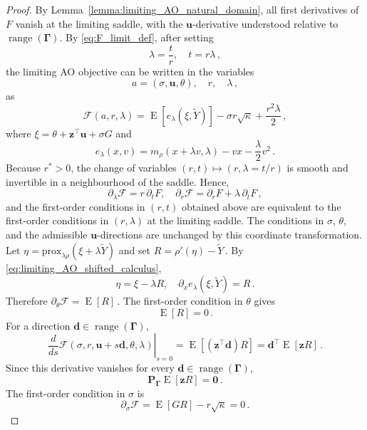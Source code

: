 \documentclass{article}
\DeclareMathOperator{\expect}{E}
\theoremstyle{definition}
\newcommand*{\bb}{\boldsymbol}
\newcommand{\prox}[2]{\ensuremath{\textrm{prox}_{#1}\left(#2\right)}}
\def\bu{\bb{u}}
\def\Ytil{\widetilde{Y}}
\def\bz{\bb{z}}
\newcommand{\range}{\operatorname{range}}
\begin{document}
\begin{bibunit}
\begin{proof}
	By Lemma~\ref{lemma:limiting_AO_natural_domain}, all first derivatives
	of $F$ vanish at the limiting saddle, with the $\bu$-derivative
	understood relative to $\range(\bb\Gamma)$.
	By \eqref{eq:F_limit_def}, after setting
	$$
		\lambda=\frac tr,
		\quad
		t=r\lambda\,,
	$$
	the limiting AO objective can be written in the variables
	$$
		a=(\sigma,\bu,\theta),
		\quad
		r,
		\quad
		\lambda\,,
	$$
	as
	\begin{equation}
		\label{eq:limiting_AO_transformed_objective}
		\mathcal F(a,r,\lambda)
		=
		\expect[
			e_\lambda(\xi,\Ytil)
		]
		-
		\sigma r\sqrt\kappa
		+
		\frac{r^2\lambda}{2}\,,
	\end{equation}
	where $\xi=\theta+\bz^\top\bu+\sigma G$
	and
	$$
		e_\lambda(x,v)
		=
		m_\rho(x+\lambda v,\lambda)-vx-\frac{\lambda}{2}v^2\,.
	$$
	Because $r^*>0$, the change of variables $(r,t)\mapsto(r,\lambda=t/r)$ is smooth and invertible in a neighbourhood of the saddle. 
    Hence, 
	$$
		\partial_\lambda\mathcal F
		=
		r\,\partial_tF,
		\quad
		\partial_r\mathcal F
		=
		\partial_rF+\lambda\,\partial_tF\,,
	$$
	and the first-order conditions in $(r,t)$ obtained above are equivalent
	to the first-order conditions in $(r,\lambda)$ at the limiting saddle.
	The conditions in $\sigma$, $\theta$, and the admissible
	$\bu$-directions are unchanged by this coordinate transformation.
	Let $\eta = \prox{\lambda\rho}{\xi+\lambda \Ytil}$
	and set $R=\rho'(\eta)-\Ytil\,.$
	By \eqref{eq:limiting_AO_shifted_calculus},
	$$
		\eta
		=
		\xi-\lambda R,
		\quad
		\partial_xe_\lambda(\xi,\Ytil)
		=
		R\,.
	$$
	Therefore $\partial_\theta\mathcal F = \expect[R]\,.$
	The first-order condition in $\theta$ gives
	\begin{equation}
		\label{eq:foc_theta_raw}
		\expect[R]=0\,.
	\end{equation}
	For a direction $\bb d\in\range(\bb\Gamma)$,
	$$
		\left.
		\frac{d}{ds}
		\mathcal F(\sigma,r,\bu+s\bb d,\theta,\lambda)
		\right|_{s=0}
		=
		\expect[(\bz^\top\bb d)R]
		=
		\bb d^\top\expect[\bz R]\,.
	$$
	Since this derivative vanishes for every $\bb d\in\range(\bb\Gamma)$,
	\begin{equation}
		\label{eq:foc_u_raw}
		\bb P_{\bb \Gamma}
		\expect[\bz R]=\bb0\,.
	\end{equation}
	The first-order condition in $\sigma$ is
	\begin{equation}
		\label{eq:foc_sigma_start}
		\partial_\sigma\mathcal F
		=
		\expect[GR]-r\sqrt\kappa
		=
		0\,.
	\end{equation}

\end{proof}
\end{bibunit}
\end{document}
